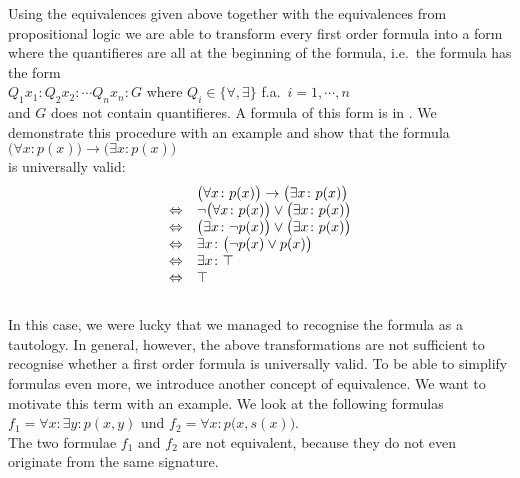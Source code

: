 Using the equivalences given above together with the equivalences from propositional logic we are able
to transform every first order formula into a form where the quantifieres are all at the beginning of the
formula, i.e.~the formula has the form
\\[0.2cm]
\hspace*{1.3cm}
$Q_1 x_1: Q_2 x_2: \cdots Q_n x_n: G$ \quad where $Q_i \in \{ \forall, \exists \}$ f.a.~$i=1,\cdots,n$
\\[0.2cm]
and $G$ does not contain quantifieres.  A formula of this form is in 
.  We demonstrate this procedure with an example and show
that the formula
\\[0.2cm]
\hspace*{1.3cm}
$\bigl(\forall x\colon p(x)\bigr) \rightarrow \bigl(\exists x\colon p(x)\bigr)$ 
\\[0.2cm]
is universally valid: 
$$ 
\begin{array}{ll}
                 & \bigl(\forall x\colon p(x)\bigr) \rightarrow \bigl(\exists x\colon p(x)\bigr)  \\
 \Leftrightarrow & \neg \bigl(\forall x\colon p(x)\bigr) \vee \bigl(\exists x\colon p(x)\bigr)    \\
 \Leftrightarrow & \bigl(\exists x\colon \neg p(x)\bigr) \vee \bigl(\exists x\colon p(x)\bigr)    \\
 \Leftrightarrow & \exists x\colon \bigl(\neg p(x) \vee p(x)\bigr) \\
 \Leftrightarrow & \exists x\colon \top                                                  \\
 \Leftrightarrow & \top                                                  \\
\end{array}
$$
\\[0.2cm]
In this case, we were lucky that we managed to recognise the formula as a tautology.
In general, however, the above transformations are not sufficient to recognise
whether a first order formula is universally valid. 
To be able to simplify formulas even more, 
we introduce another concept of equivalence.  We want to motivate this term with an example.
We look at the following formulas
\\[0.2cm]
\hspace*{1.3cm} $f_1 = \forall x \colon \exists y \colon p(x,y)$ \quad und \quad $f_2 = \forall x \colon
p\bigl(x,s(x)\bigr)$.
\\[0.2cm]
The two formulae $f_1$ and $f_2$ are not equivalent, because they do not even originate from the same signature.
